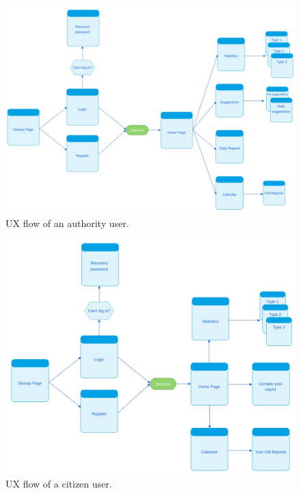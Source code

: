 \documentclass{report}
\begin{document}
\begin{figure}[!ht]
	\begin{center}
	\includegraphics[width=\textwidth]{img/AuthoritiesUX.png}
	\end{center}
    \caption{UX flow of an authority user.}
    
\end{figure}\begin{figure}[!ht]
	\begin{center}
	\includegraphics[width=\textwidth]{img/CitizenUX.png}
	\end{center}
	\caption{UX flow of a citizen user.}
\end{figure}
\end{document}
